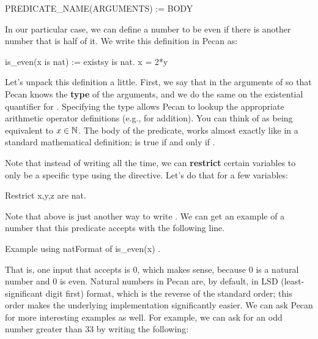 \begin{pecan}
PREDICATE_NAME(ARGUMENTS) := BODY
\end{pecan}

In our particular case, we can define a number to be even if there is another number that is half of it.
We write this definition in Pecan as:

\begin{pecan}
is_even(x is nat) := existsy is nat. x = 2*y
\end{pecan}

Let's unpack this definition a little.
First, we say that  in the arguments of  so that Pecan knows the \textbf{type} of the arguments, and we do the same on the existential quantifier for .
Specifying the type allows Pecan to lookup the appropriate arithmetic operator definitions (e.g., for addition).
You can think of  as being equivalent to $x \in \mathbb{N}$.
The body of the predicate,  works almost exactly like in a standard mathematical definition;  is true if and only if .

Note that instead of writing  all the time, we can \textbf{restrict} certain variables to only be a specific type using the  directive.
Let's do that for a few variables:

\begin{pecan}
Restrict x,y,z are nat.
\end{pecan}

Note that above  is just another way to write .
We can get an example of a number that this predicate accepts with the following line.

\begin{pecan}
Example using natFormat of { is_even(x) }.
\end{pecan}

\begin{pecan_output}
[(x,0)]
\end{pecan_output}

That is, one input that  accepts is $0$, which makes sense, because $0$ is a natural number and $0$ is even.
Natural numbers in Pecan are, by default, in LSD (least-significant digit first) format, which is the reverse of the standard order; this order makes the underlying implementation significantly easier.
We can ask Pecan for more interesting examples as well.
For example, we can ask for an odd number greater than 33 by writing the following:


